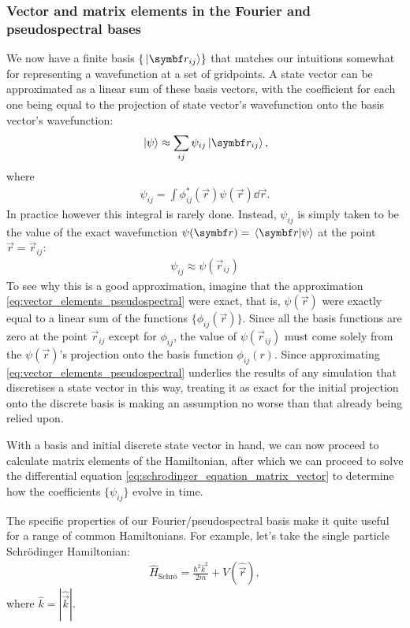 \subsubsection{Vector and matrix elements in the Fourier and pseudospectral bases}

We now have a finite basis $\{\ket{\vec r_{ij}}\}$ that matches our intuitions somewhat for representing a wavefunction at a set of gridpoints. A state vector can be approximated as a linear sum of these basis vectors, with the coefficient for each one being equal to the projection of state vector's wavefunction onto the basis vector's wavefunction:
\begin{align}\label{eq:vector_elements_pseudospectral}
\ket{\psi} \approx \sum_{ij} \psi_{ij} \ket{\vec r_{i j}},
\end{align}
where
\begin{align}
\psi_{i j} = \int \phi_{ij}^*(\vec r) \psi(\vec r) \dd{\vec r}.
\end{align}
In practice however this integral is rarely done. Instead, $\psi_{ij}$ is simply taken to be the value of the exact wavefunction $\psi(\vec r) = \braket{\vec r}{\psi}$ at the point $\vec r = \vec r_{ij}$:
\begin{align}\label{eq:pseudospectral_vector}
\psi_{i j} \approx \psi(\vec r_{ij})
\end{align}
 To see why this is a good approximation, imagine that the approximation \eqref{eq:vector_elements_pseudospectral} were exact, that is, $\psi(\vec r)$ were exactly equal to a linear sum of the functions $\{\phi_{ij}(\vec r)\}$. Since all the basis functions are zero at the point $\vec r_{ij}$ except for $\phi_{ij}$, the value of $\psi(\vec r_{ij})$ must come solely from the $\psi(\vec r)$'s projection onto the basis function $\phi_{ij}(r)$. Since approximating \eqref{eq:vector_elements_pseudospectral} underlies the results of any simulation that discretises a state vector in this way, treating it as exact for the initial projection onto the discrete basis is making an assumption no worse than that already being relied upon.


With a basis and initial discrete state vector in hand, we can now proceed to calculate matrix elements of the Hamiltonian, after which we can proceed to solve the differential equation \eqref{eq:schrodinger_equation_matrix_vector} to determine how the coefficients $\{\psi_{ij}\}$ evolve in time.

The specific properties of our Fourier/pseudospectral basis make it quite useful for a range of common Hamiltonians. For example, let's take the single particle Schr\"odinger Hamiltonian:
\begin{align}
\hat H_\textrm{Schr\"o} = \frac{\hbar^2 \hat k ^2}{2m}  + V(\hat {\vec r}),
\end{align}
where $\hat k = |\hat{\vec k}|$.

